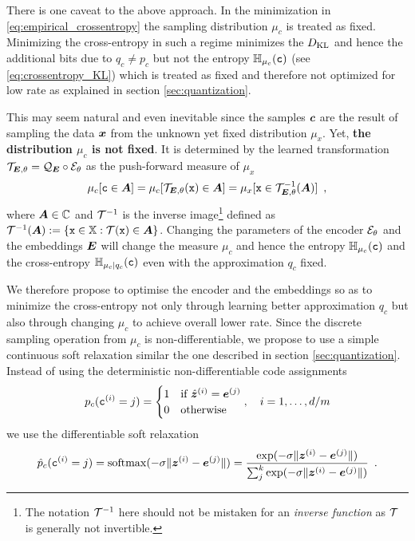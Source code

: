 \documentclass{article} %
\renewcommand{\rvx}{\mathtt{x}}
\renewcommand{\rvc}{\mathtt{c}}
\newcommand{\pc}{p_c}
\newcommand{\qc}{q_c}
\newcommand{\muc}{\mu_c}
\newcommand{\Hc}{\sH_{\muc}}
\newcommand{\cHc}{\sH_{\muc|\qc}}
\newcommand{\gEt}{\gE_\theta}
\newcommand{\gQE}{\gQ_\mE}
\newcommand{\gTEt}{\gT_{\mE, \theta}}
\newcommand{\vzh}{\hat{\vz}}
\begin{document}
There is one caveat to the above approach.
In the minimization in \eqref{eq:empirical_crossentropy} the sampling  distribution $\mu_c$ is treated as fixed.
Minimizing the cross-entropy in such a regime minimizes the $D_{\mathrm{KL}}$ and hence the additional bits due to $\qc \neq \pc$ but not the entropy $\Hc(\rvc)$ (see \eqref{eq:crossentropy_KL}) which is treated as fixed and therefore not optimized for low rate as explained in section \ref{sec:quantization}.

This may seem natural and even inevitable since the samples ${\bm{c}}$ are the result of sampling the data ${\bm{x}}$ from the unknown yet fixed distribution $\mu_x$.
Yet, \textbf{the distribution $\mu_c$ is not fixed}.
It is determined by the learned transformation $\gTEt = \gQE \circ \gEt$ as the push-forward measure of $\mu_x$
\begin{align}
\mu_c[\rvc \in \mA] = \mu_c[\gTEt(\rvx) \in \mA] = \mu_x[\rvx \in \gTEt^{-1}(\mA)] \enspace ,
\end{align}
where ${\bm{A}} \in {\mathbb{C}}$ and ${\mathcal{T}}^{-1}$ is the inverse image\footnote{The notation ${\mathcal{T}}^{-1}$ here should not be mistaken for an \emph{inverse function} as ${\mathcal{T}}$ is generally not invertible.} defined as $\gT^{-1}(\mA) := \{\rvx \in \sX : \gT(\rvx) \in \mA\}$.
Changing the parameters of the encoder $\gEt$ and the embeddings ${\bm{E}}$ will change the measure $\mu_c$ and hence the entropy $\Hc(\rvc)$ and the cross-entropy $\cHc(\rvc)$ even with the approximation $\qc$ fixed.

We therefore propose to optimise the encoder and the embeddings so as to minimize the cross-entropy not only through learning better approximation $\qc$ but also through changing $\mu_c$ to achieve overall lower rate.
Since the discrete sampling operation from $\mu_c$ is non-differentiable, we propose to use a simple continuous soft relaxation similar the one described in section \ref{sec:quantization}.
Instead of using the deterministic non-differentiable code assignments
\begin{align}\label{eq:hardprobs}
\pc(\rvc^{(i)} = j) =
\begin{cases}
1 & \text{if} \ \vzh^{(i)} = \ve^{(j)} \\
0 & \text{otherwise}
\end{cases},
\quad i = 1, \ldots, d/m
\end{align}
we use the differentiable soft relaxation
\begin{align}\label{eq:softprobs}
\hat{p}_c(\rvc^{(i)} = j) = \softmax(-\sigma \Vert \vz^{(i)} - \ve^{(j)} \Vert) = \frac{\exp(-\sigma \Vert \vz^{(i)} - \ve^{(j)} \Vert)}{\sum_j^k \exp(-\sigma \Vert \vz^{(i)} - \ve^{(j)} \Vert)} \enspace .
\end{align}
\end{document}
